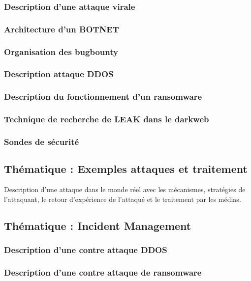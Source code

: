 \subsubsection{Description d'une attaque virale}
\subsubsection{Architecture d'un BOTNET}
\subsubsection{Organisation des bugbounty}
\subsubsection{Description attaque DDOS}
\subsubsection{Description du fonctionnement d'un ransomware}
\subsubsection{Technique de recherche de LEAK dans le darkweb}

\subsubsection{Sondes de sécurité}

\subsection{Thématique : Exemples attaques et traitement}
Description d'une attaque dans le monde réel avec les mécanismes, stratégies de l'attaquant, le retour d'expérience de l'attaqué et le traitement par les médias.
\subsection{Thématique : Incident Management}
\subsubsection{Description d'une contre attaque DDOS}
\subsubsection{Description d'une  contre attaque de ransomware} 
